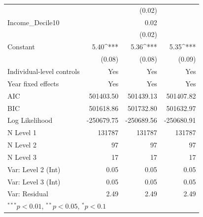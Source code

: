\documentclass[utf8]{frontiersSCNS} %
\begin{document}
\begin{table}[h]
\begin{tabular}{l D{.}{.}{7.5} D{.}{.}{7.5} D{.}{.}{7.5}}
                             &             & (0.02)      &             \\
Income\_Decile10             &             & 0.02        &             \\
                             &             & (0.02)      &             \\
\hline
Constant                     & 5.40^{***}  & 5.36^{***}  & 5.35^{***}  \\
                             & (0.08)      & (0.08)      & (0.09)      \\
\hline
Individual-level controls    &     Yes     &     Yes     &     Yes     \\
Year fixed effects           &     Yes     &     Yes     &     Yes     \\
\hline
AIC                          & 501403.50   & 501439.13   & 501407.82   \\
BIC                          & 501618.86   & 501732.80   & 501632.97   \\
Log Likelihood               & -250679.75  & -250689.56  & -250680.91  \\
N Level 1                    & 131787      & 131787      & 131787      \\
N Level 2                    & 97          & 97          & 97          \\
N Level 3                    & 17          & 17          & 17          \\
Var: Level 2 (Int)           & 0.05        & 0.05        & 0.05        \\
Var: Level 3 (Int)           & 0.05        & 0.05        & 0.05        \\
Var: Residual                & 2.49        & 2.49        & 2.49        \\
\bottomrule
{}
\end{tabular}
\end{table}
\end{document}
